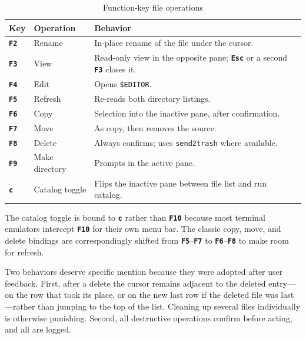 \documentclass[tm]{ornltm}
\newcommand{\key}[1]{\textbf{\texttt{#1}}}
\begin{document}
\begin{table}[ht]
  \centering
  \begin{threeparttable}
  \caption{Function-key file operations}
  \label{tab:fkeys}
  \small
  \begin{tabular}{l l p{}}
    \toprule
    Key & Operation & Behavior \\
    \midrule
    \key{F2} & Rename & In-place rename of the file under the cursor. \\
    \key{F3} & View & Read-only view in the opposite pane; \key{Esc} or a
      second \key{F3} closes it. \\
    \key{F4} & Edit & Opens \texttt{\$EDITOR}. \\
    \key{F5} & Refresh & Re-reads both directory listings. \\
    \key{F6} & Copy & Selection into the inactive pane, after confirmation. \\
    \key{F7} & Move & As copy, then removes the source. \\
    \key{F8} & Delete & Always confirms; uses \texttt{send2trash} where
      available. \\
    \key{F9} & Make directory & Prompts in the active pane. \\
    \key{c} & Catalog toggle & Flips the inactive pane between file list and run
      catalog.\tnote{a} \\
    \bottomrule
  \end{tabular}
  \begin{tablenotes}
    \item[a] The catalog toggle is bound to \key{c} rather than \key{F10}
    because most terminal emulators intercept \key{F10} for their own menu bar.
    The classic copy, move, and delete bindings are correspondingly shifted from
    \key{F5}--\key{F7} to \key{F6}--\key{F8} to make room for refresh.
  \end{tablenotes}
  \end{threeparttable}
\end{table}

Two behaviors deserve specific mention because they were adopted after user
feedback. First, after a delete the cursor remains adjacent to the deleted
entry---on the row that took its place, or on the new last row if the deleted
file was last---rather than jumping to the top of the list. Cleaning up several
files individually is otherwise punishing. Second, all destructive operations
confirm before acting, and all are logged.
\end{document}
